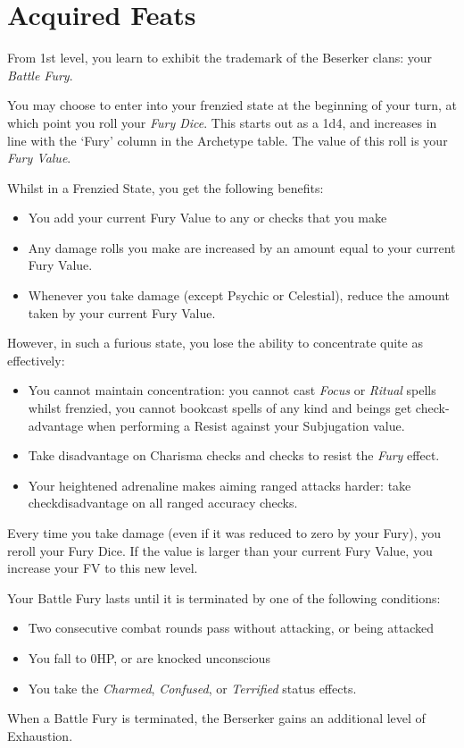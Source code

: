 \section*{Acquired Feats}

{
From 1st level, you learn to exhibit the trademark of the Beserker clans: your {\it Battle Fury}. 

You may choose to enter into your frenzied state at the beginning of your turn, at which point you roll your {\it Fury Dice}. This starts out as a 1d4, and increases in line with the `Fury' column in the Archetype table. The value of this roll is your {\it Fury Value}.


Whilst in a Frenzied State, you get the following benefits:

\begin{itemize}
	\item You add your current Fury Value to any \attPhys{} or \attSpr{} checks that you make
	\item Any damage rolls you make are increased by an amount equal to your current Fury Value. 
	\item Whenever you take damage (except Psychic or Celestial), reduce the amount taken by your current Fury Value. 
\end{itemize} 

However, in such a furious state, you lose the ability to concentrate quite as effectively:
\begin{itemize}
	\item You cannot maintain concentration: you cannot cast {\it Focus} or {\it Ritual} spells whilst frenzied, you cannot book\minus{}cast spells of any kind and beings get check-advantage when performing a Resist against your Subjugation value.  
	\item Take disadvantage on Charisma checks and checks to resist the {\it Fury} effect. 
	\item Your heightened adrenaline makes aiming ranged attacks harder: take check\minus{}disadvantage on all ranged accuracy checks.
\end{itemize}


Every time you take damage (even if it was reduced to zero by your Fury), you re\minus{}roll your Fury Dice. If the value is larger than your current Fury Value, you increase your FV to this new level.

Your Battle Fury lasts until it is terminated by one of the following conditions:
\begin{itemize}
	\item Two consecutive combat rounds pass without attacking, or being attacked
	\item You fall to 0HP, or are knocked unconscious
	\item You take the {\it Charmed}, {\it Confused}, or {\it Terrified} status effects. 
\end{itemize}

When a Battle Fury is terminated, the Berserker gains an additional level of Exhaustion. 

}

